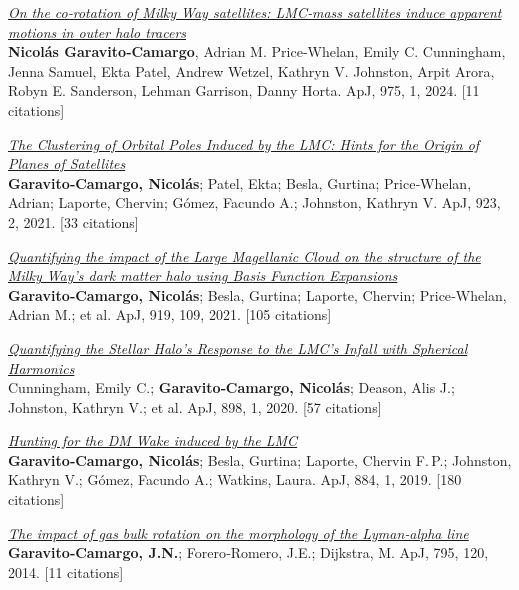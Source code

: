 \documentclass[14pt]{article}
\begin{document}
\begin{etaremune}
\item \textit{\href{https://ui.adsabs.harvard.edu/abs/2024ApJ...975..100G/abstract}{On the co‑rotation of Milky Way satellites: LMC‑mass satellites induce apparent motions in outer halo tracers}}\\
{ \small \color{darkgray} \textbf{Nicol\'as Garavito‑Camargo}, Adrian M. Price‑Whelan, Emily C. Cunningham, Jenna Samuel, Ekta Patel, Andrew Wetzel, Kathryn V. Johnston, Arpit Arora, Robyn E. Sanderson, Lehman Garrison, Danny Horta. ApJ, 975, 1, 2024. [11 citations]}

\item \textit{\href{https://ui.adsabs.harvard.edu/abs/2021ApJ...923...33G/abstract}{The Clustering of Orbital Poles Induced by the LMC: Hints for the Origin of Planes of Satellites}}\\
{ \small \color{darkgray} \textbf{Garavito‑Camargo, Nicol\'as}; Patel, Ekta; Besla, Gurtina; Price‑Whelan, Adrian; Laporte, Chervin; G\'omez, Facundo A.; Johnston, Kathryn V. ApJ, 923, 2, 2021. [33 citations]}

\item \textit{\href{https://ui.adsabs.harvard.edu/abs/2021ApJ...919..109G/abstract}{Quantifying the impact of the Large Magellanic Cloud on the structure of the Milky Way’s dark matter halo using Basis Function Expansions}}\\
{ \small \color{darkgray} \textbf{Garavito‑Camargo, Nicol\'as}; Besla, Gurtina; Laporte, Chervin; Price‑Whelan, Adrian M.; et al. ApJ, 919, 109, 2021. [105 citations]}

\item \textit{\href{https://ui.adsabs.harvard.edu/abs/2020ApJ...898....4C/abstract}{Quantifying the Stellar Halo's Response to the LMC's Infall with Spherical Harmonics}}\\
{ \small \color{darkgray} Cunningham, Emily C.; \textbf{Garavito‑Camargo, Nicol\'as}; Deason, Alis J.; Johnston, Kathryn V.; et al. ApJ, 898, 1, 2020. [57 citations]}

\item \textit{\href{https://ui.adsabs.harvard.edu/abs/2019ApJ...884....1G/abstract}{Hunting for the DM Wake induced by the LMC}}\\
{ \small \color{darkgray} \textbf{Garavito‑Camargo, Nicol\'as}; Besla, Gurtina; Laporte, Chervin F. P.; Johnston, Kathryn V.; G\'omez, Facundo A.; Watkins, Laura. ApJ, 884, 1, 2019. [180 citations]}

\item \textit{\href{https://ui.adsabs.harvard.edu/abs/2014ApJ...795..120G/abstract}{The impact of gas bulk rotation on the morphology of the Lyman‑alpha line}}\\
{ \small \color{darkgray} \textbf{Garavito‑Camargo, J.N.}; Forero‑Romero, J.E.; Dijkstra, M. ApJ, 795, 120, 2014. [11 citations]}

\end{etaremune}
\end{document}

